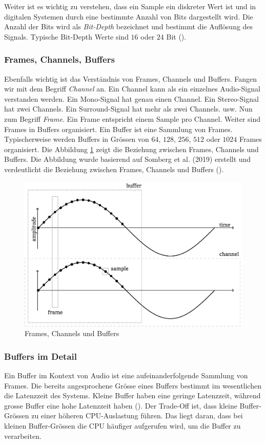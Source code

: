\documentclass[11pt,a4paper]{article}
\begin{document}
\noindent \newline
Weiter ist es wichtig zu verstehen, dass ein Sample ein diskreter Wert ist und in digitalen 
Systemen durch eine bestimmte Anzahl von Bits dargestellt wird. Die Anzahl der Bits wird
als \textit{Bit-Depth} bezeichnet und bestimmt die Auflösung des Signals. Typische
Bit-Depth Werte sind \(16\) oder \(24\) Bit (\cite[p.10]{somberg2019audioapi}).

\subsubsection{Frames, Channels, Buffers}
Ebenfalls wichtig ist das Verständnis von Frames, Channels und Buffers. Fangen wir mit dem Begriff \textit{Channel} an. Ein Channel kann als
ein einzelnes Audio-Signal verstanden werden. Ein Mono-Signal hat genau einen Channel. Ein
Stereo-Signal hat zwei Channels. Ein Surround-Signal hat mehr als zwei Channels. usw.
Nun zum Begriff \textit{Frame}. Ein Frame entspricht einem Sample pro Channel. Weiter sind Frames
in Buffers organisiert. Ein Buffer ist eine Sammlung von Frames. Typischerweise werden Buffers in
Grössen von \(64\), \(128\), \(256\), \(512\) oder \(1024\) Frames organisiert. Die Abbildung
\ref{fig:frames_channels_buffers} zeigt die Beziehung zwischen Frames, Channels und Buffers.
Die Abbildung wurde basierend auf Somberg et al. (2019) erstellt und verdeutlicht die
Beziehung zwischen Frames, Channels und Buffers (\cite[p.10]{somberg2019audioapi}).

\begin{figure}[h]
	\centering
	\includegraphics[width=0.7\linewidth]{img/audio-nutshell.pdf}
	\caption{Frames, Channels und Buffers}
	\label{fig:frames_channels_buffers}
\end{figure}

\subsubsection{Buffers im Detail}
Ein Buffer im Kontext von Audio ist eine aufeinanderfolgende Sammlung von Frames. Die bereits
angesprochene Grösse eines Buffers bestimmt im wesentlichen die Latenzzeit des Systems. Kleine
Buffer haben eine geringe Latenzzeit, während grosse Buffer eine hohe Latenzzeit
haben (\cite[p.10]{somberg2019audioapi}). Der Trade-Off ist, dass kleine Buffer-Grössen
zu einer höheren CPU-Auslastung führen.
Das liegt daran, dass bei kleinen Buffer-Grössen die CPU häufiger aufgerufen wird, um die Buffer
zu verarbeiten.
\end{document}
